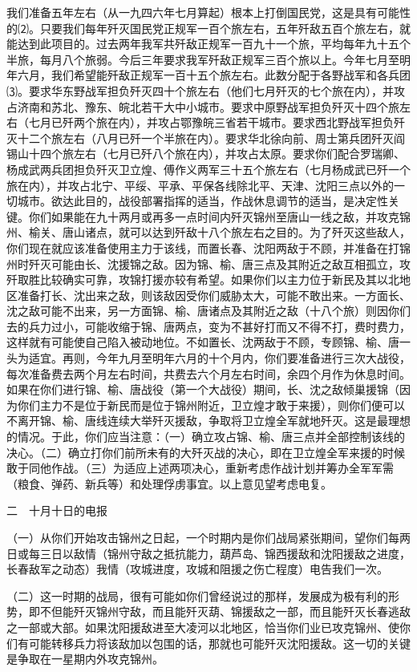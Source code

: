 \documentclass[UTF-8, a5paper, 12pt]{ctexart}
\begin{document}
我们准备五年左右（从一九四六年七月算起）根本上打倒国民党，这是具有可能性的⑵。只要我们每年歼灭国民党正规军一百个旅左右，五年歼敌五百个旅左右，就能达到此项目的。过去两年我军共歼敌正规军一百九十一个旅，平均每年九十五个半旅，每月八个旅弱。今后三年要求我军歼敌正规军三百个旅以上。今年七月至明年六月，我们希望能歼敌正规军一百十五个旅左右。此数分配于各野战军和各兵团⑶。要求华东野战军担负歼灭四十个旅左右（他们七月歼灭的七个旅在内），并攻占济南和苏北、豫东、皖北若干大中小城市。要求中原野战军担负歼灭十四个旅左右（七月已歼两个旅在内），并攻占鄂豫皖三省若干城市。要求西北野战军担负歼灭十二个旅左右（八月已歼一个半旅在内）。要求华北徐向前、周士第兵团歼灭阎锡山十四个旅左右（七月已歼八个旅在内），并攻占太原。要求你们配合罗瑞卿、杨成武两兵团担负歼灭卫立煌、傅作义两军三十五个旅左右（七月杨成武已歼一个旅在内），并攻占北宁、平绥、平承、平保各线除北平、天津、沈阳三点以外的一切城市。欲达此目的，战役部署指挥的适当，作战休息调节的适当，是决定性关键。你们如果能在九十两月或再多一点时间内歼灭锦州至唐山一线之敌，并攻克锦州、榆关、唐山诸点，就可以达到歼敌十八个旅左右之目的。为了歼灭这些敌人，你们现在就应该准备使用主力于该线，而置长春、沈阳两敌于不顾，并准备在打锦州时歼灭可能由长、沈援锦之敌。因为锦、榆、唐三点及其附近之敌互相孤立，攻歼取胜比较确实可靠，攻锦打援亦较有希望。如果你们以主力位于新民及其以北地区准备打长、沈出来之敌，则该敌因受你们威胁太大，可能不敢出来。一方面长、沈之敌可能不出来，另一方面锦、榆、唐诸点及其附近之敌（十八个旅）则因你们去的兵力过小，可能收缩于锦、唐两点，变为不甚好打而又不得不打，费时费力，这样就有可能使自己陷入被动地位。不如置长、沈两敌于不顾，专顾锦、榆、唐一头为适宜。再则，今年九月至明年六月的十个月内，你们要准备进行三次大战役，每次准备费去两个月左右时间，共费去六个月左右时间，余四个月作为休息时间。如果在你们进行锦、榆、唐战役（第一个大战役）期间，长、沈之敌倾巢援锦（因为你们主力不是位于新民而是位于锦州附近，卫立煌才敢于来援），则你们便可以不离开锦、榆、唐线连续大举歼灭援敌，争取将卫立煌全军就地歼灭。这是最理想的情况。于此，你们应当注意：（一）确立攻占锦、榆、唐三点并全部控制该线的决心。（二）确立打你们前所未有的大歼灭战的决心，即在卫立煌全军来援的时候敢于同他作战。（三）为适应上述两项决心，重新考虑作战计划并筹办全军军需（粮食、弹药、新兵等）和处理俘虏事宜。以上意见望考虑电复。

二　十月十日的电报

（一）从你们开始攻击锦州之日起，一个时期内是你们战局紧张期间，望你们每两日或每三日以敌情（锦州守敌之抵抗能力，葫芦岛、锦西援敌和沈阳援敌之进度，长春敌军之动态）我情（攻城进度，攻城和阻援之伤亡程度）电告我们一次。

（二）这一时期的战局，很有可能如你们曾经说过的那样，发展成为极有利的形势，即不但能歼灭锦州守敌，而且能歼灭葫、锦援敌之一部，而且能歼灭长春逃敌之一部或大部。如果沈阳援敌进至大凌河以北地区，恰当你们业已攻克锦州、使你们有可能转移兵力将该敌加以包围的话，那就也可能歼灭沈阳援敌。这一切的关键是争取在一星期内外攻克锦州。
\end{document}
